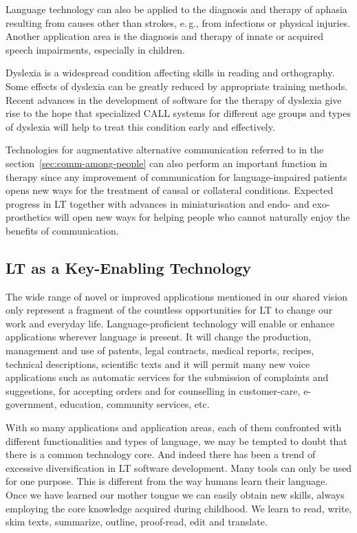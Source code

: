 \documentclass[10pt, plain]{../../metanetpaper}
\begin{document}
\begin{multicols}{2}
Language technology can also be applied to the diagnosis and therapy of aphasia resulting from causes other than strokes, e.\,g., from infections or physical injuries. Another application area is the diagnosis and therapy of innate or acquired speech impairments, especially in children. 
 
Dyslexia is a widespread condition affecting skills in reading and orthography. Some effects of dyslexia can be greatly reduced by appropriate training methods. Recent advances in the development of software for the therapy of dyslexia give rise to the hope that specialized CALL systems for different age groups and types of dyslexia will help to treat this condition early and effectively.
 
Technologies for augmentative alternative communication referred to in the section~\ref{sec:comm-among-people} can also perform an important function in therapy since any improvement of communication for language-impaired patients opens new ways for the treatment of causal or collateral conditions. Expected progress in LT together with advances in miniaturisation and endo- and exo-prosthetics will open new ways for helping people who cannot naturally enjoy the benefits of communication.

\subsection[Language Technology as a Key-Enabling Technology]{LT as a Key-Enabling Technology}
\label{sec:lang-techn-as-key-enabling-technology}

The wide range of novel or improved applications mentioned in our shared vision only represent a fragment of the countless opportunities for LT to change our work and everyday life. Language-proficient technology will enable or enhance applications wherever language is present. It will change the production, management and use of patents, legal contracts, medical reports, recipes, technical descriptions, scientific texts and it will permit many new voice applications such as automatic services for the submission of complaints and suggestions, for accepting orders and for counselling in customer-care, e-government, education, community services, etc.   

With so many applications and application areas, each of them confronted with different functionalities and types of language, we may be tempted to doubt that there is a common technology core. And indeed there has been a trend of excessive diversification in LT software development. Many tools can only be used for one purpose. This is different from the way humans learn their language. Once we have learned our mother tongue we can easily obtain new skills, always employing the core knowledge acquired during childhood. We learn to read, write, skim texts, summarize, outline, proof-read, edit and translate.
 

\end{multicols}
\end{document}
